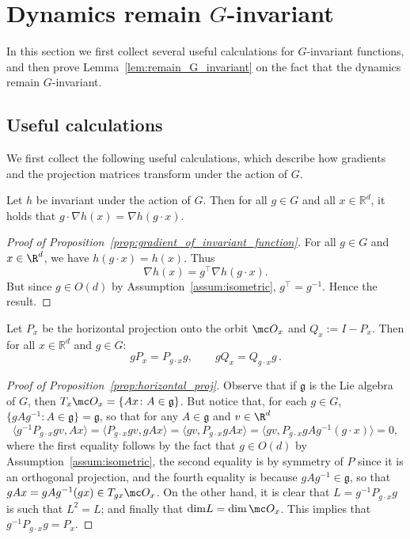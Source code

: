 \documentclass[twoside,a4paper,11pt]{article}
\theoremstyle{plain}
\begin{document}
    
\section{Dynamics remain $G$-invariant}
\label{appendix:dynamics_remain_g_invariant}
In this section we first collect
several useful calculations for $G$-invariant
functions, and then prove 
Lemma~\ref{lem:remain_G_invariant} on the
fact that the dynamics remain $G$-invariant.

\subsection{Useful calculations}
We first collect the following useful calculations,
which describe how gradients and the projection
matrices transform under the action of $G$.
\begin{prop}
\label{prop:gradient_of_invariant_function}
    Let $h$ be invariant under the action of $G$. Then for all $g \in G$ and all $x \in \mathbb{R}^d$, it holds that $g \cdot \nabla h(x) = \nabla h(g\cdot x)$.
\end{prop}
\begin{proof}[Proof of Proposition~\ref{prop:gradient_of_invariant_function}]
For all $g \in G$ and $x \in \R^d$, we have $h(g\cdot x) = h(x)$.
Thus
$$
\nabla h(x) = g^\top\nabla h(g\cdot x).
$$ But since $g \in O(d)$ by Assumption~\ref{assum:isometric},
$g^\top = g^{-1}$. Hence the result.
\end{proof}


\begin{prop}
\label{prop:horizontal_proj}
    Let $P_x$ be the horizontal projection onto the 
    orbit $\mc O_x$ and $Q_x := I - P_x$.
    Then for all $x\in \mathbb{R}^d$ and $g \in G$:
    $$
 gP_x = P_{g\cdot x}g, \quad \quad 
    gQ_x = Q_{g\cdot x} g\,.
    $$
\end{prop}

\begin{proof}[Proof of Proposition~\ref{prop:horizontal_proj}]
Observe that if $\mathfrak{g}$ is the Lie algebra
of $G$, then $T_x \mc O_x = \{Ax \colon A \in \mathfrak{g}\}$.
But notice that, for each $g \in G$,
$\{gAg^{-1} \colon A \in \mathfrak{g} \} = \mathfrak{g}$, so that
for any $A \in \mathfrak{g}$ and $v \in \R^d$
$$
\langle g^{-1}P_{g \cdot x}gv,Ax \rangle
= \langle P_{g \cdot x}g v, gAx \rangle
= \langle g v, P_{g\cdot x} gAx \rangle=
\langle gv, P_{g\cdot x} gAg^{-1} (g\cdot x) \rangle = 0,
$$
where the first equality follows by the fact that $g \in O(d)$
by Assumption~\ref{assum:isometric}, the second equality
is by symmetry of $P$ since it is an orthogonal projection,
and the fourth equality is because $gAg^{-1} \in \mathfrak{g}$,
so that $gAx = gAg^{-1}(gx) \in T_{gx}\mc O_x$.
On the other hand, it is clear that $L = g^{-1}P_{g\cdot x} g$
is such that $L^2 = L$; and finally that 
$\mathrm{dim} L = \dim \mc O_x$.
This implies that $g^{-1}P_{g\cdot x} g = P_x$.
\end{proof}
\end{document}
